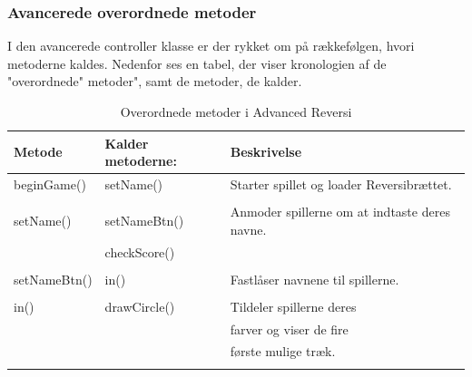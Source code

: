 \subsubsection{Avancerede overordnede metoder}\label{AOM}
I den avancerede controller klasse er der rykket om på rækkefølgen, hvori metoderne kaldes. Nedenfor ses en tabel, der viser kronologien af de "overordnede" metoder", samt de metoder, de kalder.
\begin{table}[H]
    \centering
    \caption{Overordnede metoder i Advanced Reversi}\label{tbl:}
    \begin{tabular}{lll}
        \toprule
        Metode          & Kalder metoderne: & Beskrivelse                                                         \\
        \midrule
        beginGame()     & setName()         & Starter spillet og loader Reversibrættet.                                                   \\
                        & \\
                        
        setName()       & setNameBtn()      & Anmoder spillerne om at indtaste deres navne.                                          \\
                        & checkScore()      &                                                                   \\
                        &                   &                                                                   \\

        setNameBtn()    & in()              & Fastlåser navnene til spillerne.                     \\
                        &                                                                                       \\

        in()            & drawCircle()      & Tildeler spillerne deres                                          \\
                        &                   & farver og viser de fire                                           \\
                        &                   & første mulige træk.                                                \\
                        &                   &                                                                   \\


\end{tabular}
\end{table}
